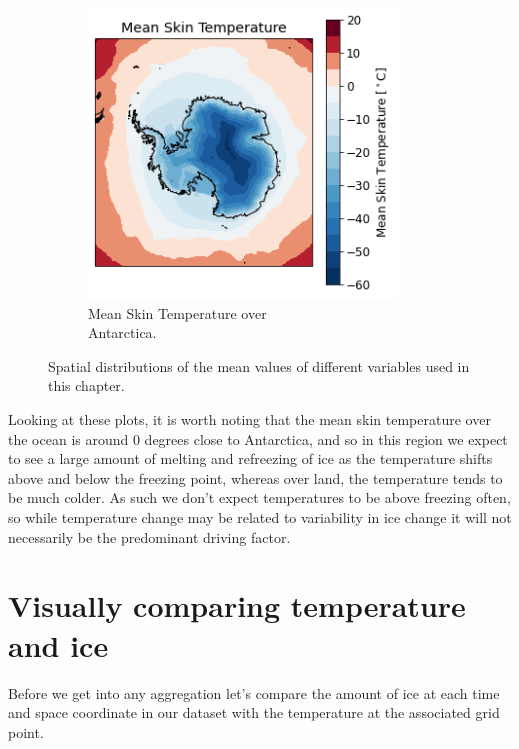 \documentclass[../main.tex]{subfiles}
\begin{document}
\begin{figure}[H]
\begin{subfigure}[h!]{0.49\textwidth}
\includegraphics[width=0.9\textwidth]{images/week8/lres/mean_skt_distribution}
\caption{Mean Skin Temperature over \\ Antarctica.}
\end{subfigure}
\caption{Spatial distributions of the mean values of different variables used in this chapter.}
\label{fig:mean_distributions}
\end{figure}

Looking at these plots, it is worth noting that the mean skin temperature over the ocean is around 0 degrees close to Antarctica, and so in this region we expect to see a large amount of melting and refreezing of ice as the temperature shifts above and below the freezing point, whereas over land, the temperature tends to be much colder. As such we don't expect temperatures to be above freezing often, so while temperature change may be related to variability in ice change it will not necessarily be the predominant driving factor. 


\section{Visually comparing temperature and ice}
Before we get into any aggregation let's compare the amount of ice at each time and space coordinate in our dataset with the temperature at the associated grid point. 
\end{document}
